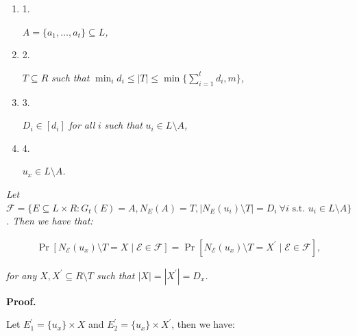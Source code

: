 \begin{enumerate}


\item[] 1. 


$A=\{a_{1},\dots,a_{t}\}\subseteq L$\emph{,}\par




\item[] 2. 


$T\subseteq R$\emph{ such that }$\min_{i}{d_{i}}\leq|T|\leq\min\{\sum_{i=1}^{t}d_{i},m\}$\emph{,}\par




\item[] 3. 


$D_{i}\in[d_{i}]$\emph{ for all }$i$\emph{ such that }$u_{i}\in L\setminus A$\emph{,}\par




\item[] 4. 


$u_{x}\in L\setminus A$\emph{.}\par




\end{enumerate}


\emph{Let $\mathscr{F}=\{E\subseteq L\times R:G_{t}(E)=A,N_{E}(A)=T,|N_{E}(u_{i})\setminus T|=D_{i}\ \forall i\text{ s.t. }u_{i}\in L\setminus A\}$.
Then we have that:}\par


\[\begin{gathered}
\displaystyle\Pr\left[N_{\mathcal{E}}(u_{x})\setminus T=X\mid\mathcal{E}\in\mathscr{F}\right]=\Pr\left[N_{\mathcal{E}}(u_{x})\setminus T=X^{\prime}\mid\mathcal{E}\in\mathscr{F}\right],
\end{gathered}\]


\emph{for any $X,X^{\prime}\subseteq R\setminus T$ such that $|X|=|X^{\prime}|=D_{x}$.}\par






\par\medskip\noindent\textbf{Proof.}\par



Let $E^{\prime}_{1}=\{u_{x}\}\times X$ and $E^{\prime}_{2}=\{u_{x}\}\times X^{\prime}$, then we have:\par


